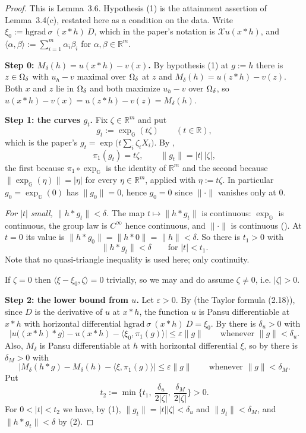 \begin{proof}
This is Lemma~3.6. Hypothesis (1) is the attainment assertion of Lemma~3.4(c), restated
here as a condition on the data. Write $\xi_0:=\mathrm{hgrad}\ \sigma\ (x*h)\ D$, which in
the paper's notation is $\mathcal Xu(x*h)$, and
$\langle\alpha,\beta\rangle:=\sum_{i=1}^{m}\alpha_i\beta_i$ for $\alpha,\beta\in\mathbb R^{m}$.

\medskip\noindent\textbf{Step 0: $M_\delta(h)=u(x*h)-v(x)$.} By hypothesis (1) at $g:=h$
there is $z\in\Omega_\delta$ with $u_h-v$ maximal over $\Omega_\delta$ at $z$ and
$M_\delta(h)=u(z*h)-v(z)$. Both $x$ and $z$ lie in $\Omega_\delta$ and both maximize $u_h-v$
over $\Omega_\delta$, so $u(x*h)-v(x)=u(z*h)-v(z)=M_\delta(h)$.

\medskip\noindent\textbf{Step 1: the curves $g_t$.} Fix $\zeta\in\mathbb R^{m}$ and put
\[
 g_t:=\exp_{\mathbb G}(t\zeta)\qquad(t\in\mathbb R),
\]
which is the paper's $g_t=\exp\big(t\sum_i\zeta_iX_i\big)$. By ,
\[
 \pi_1(g_t)=t\zeta,\qquad \|g_t\|=|t|\,|\zeta| , \tag{1}
\]
the first because $\pi_1\circ\exp_{\mathbb G}$ is the identity of $\mathbb R^{m}$ and the
second because $\|\exp_{\mathbb G}(\eta)\|=|\eta|$ for every $\eta\in\mathbb R^{m}$, applied
with $\eta:=t\zeta$. In particular $g_0=\exp_{\mathbb G}(0)$ has $\|g_0\|=0$, hence
$g_0=0$ since $\|\cdot\|$ vanishes only at $0$.

\emph{For $|t|$ small, $\|h*g_t\|<\delta$.} The map $t\mapsto\|h*g_t\|$ is continuous:
$\exp_{\mathbb G}$ is continuous, the group law is $C^{\infty}$ hence continuous, and
$\|\cdot\|$ is continuous (). At $t=0$ its value is
$\|h*g_0\|=\|h*0\|=\|h\|<\delta$. So there is $t_1>0$ with
\[
 \|h*g_t\|<\delta\qquad\text{for }|t|<t_1 . \tag{2}
\]
Note that no quasi-triangle inequality is used here; only continuity.

If $\zeta=0$ then $\langle\xi-\xi_0,\zeta\rangle=0$ trivially, so we may and do assume
$\zeta\ne0$, i.e. $|\zeta|>0$.

\medskip\noindent\textbf{Step 2: the lower bound from $u$.} Let $\varepsilon>0$. By
 (the Taylor formula (2.18)), since $D$ is the derivative of $u$
at $x*h$, the function $u$ is Pansu differentiable at $x*h$ with horizontal differential
$\mathrm{hgrad}\ \sigma\ (x*h)\ D=\xi_0$. By  there is
$\delta_u>0$ with
\[
 \Big|u\big((x*h)*g\big)-u(x*h)-\langle\xi_0,\pi_1(g)\rangle\Big|\le\varepsilon\|g\|
 \qquad\text{whenever }\|g\|<\delta_u . \tag{3}
\]
Also, $M_\delta$ is Pansu differentiable at $h$ with horizontal differential $\xi$, so by
 there is $\delta_M>0$ with
\[
 \Big|M_\delta(h*g)-M_\delta(h)-\langle\xi,\pi_1(g)\rangle\Big|\le\varepsilon\|g\|
 \qquad\text{whenever }\|g\|<\delta_M . \tag{4}
\]
Put
\[
 t_2:=\min\Big\{t_1,\ \frac{\delta_u}{2|\zeta|},\ \frac{\delta_M}{2|\zeta|}\Big\}>0 .
\]
For $0<|t|<t_2$ we have, by (1), $\|g_t\|=|t||\zeta|<\delta_u$ and $\|g_t\|<\delta_M$, and
$\|h*g_t\|<\delta$ by (2).


\end{proof}
